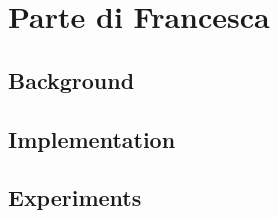 \chapter{Parte di Francesca}

\section{Background}

\section{Implementation}

\section{Experiments}

